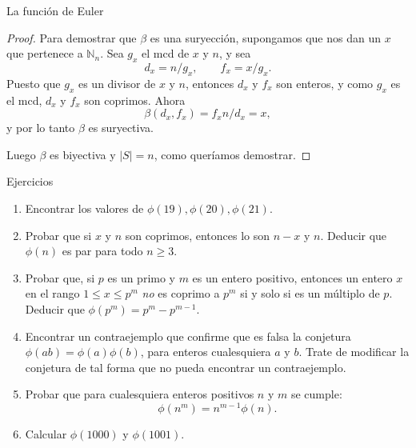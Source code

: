 \documentclass[11pt,spanish,makeidx]{amsbook}
\theoremstyle{definition}
\theoremstyle{remark}
\begin{document}
\begin{section}{La función de Euler}
\begin{proof}
Para demostrar que $\beta$ es una suryección, supongamos que nos
dan un $x$ que pertenece a $\mathbb N_n$. Sea $g_x$ el mcd de $x$
y $n$, y sea
$$
d_x = n/g_x, \qquad f_x = x /g_x.
$$
Puesto que $g_x$ es un divisor de $x$ y $n$, entonces $d_x$ y
$f_x$ son enteros, y como $g_x$ es el mcd, $d_x$ y $f_x$ son
coprimos. Ahora
$$
\beta(d_x,f_x) = f_x n/d_x = x,
$$
y por lo tanto $\beta$ es suryectiva.

Luego $\beta$ es biyectiva y $|S|=n$, como queríamos demostrar.
\end{proof}

\begin{subsection}{Ejercicios}
\begin{enumerate}
\item Encontrar los valores de $\phi(19), \phi(20), \phi(21)$.
\item Probar que si $x$ y $n$ son coprimos, entonces lo son $n-x$ y
$n$. Deducir que $\phi(n)$ es par para todo $n \ge 3$.
\item Probar que, si $p$ es un primo y $m$ es un entero positivo,
entonces un entero $x$ en el rango $1 \le x \le p^m$ {\it no} es
coprimo a $p^m$ si y solo si es un múltiplo de $p$. Deducir que
$\phi(p^m) = p^m - p^{m-1}$.
\item Encontrar un contraejemplo que confirme que es falsa la conjetura
$\phi(ab)= \phi(a)\phi(b)$, para enteros cualesquiera $a$ y $b$.
Trate de modificar la conjetura de tal forma que no pueda
encontrar un contraejemplo.
\item Probar que para cualesquiera enteros positivos $n$ y $m$ se cumple:
$$
\phi(n^m) =n^{m-1}\phi(n).
$$
\item Calcular $\phi(1000)$ y $\phi(1001)$.
\end{enumerate}
\end{subsection}

\end{section}
\end{document}
